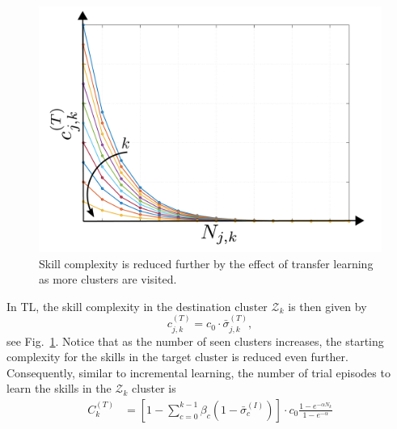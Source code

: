 \begin{figure}[!h]
	\centering
	\includegraphics[width=0.99\columnwidth]{fig/single_transfer_complexity.pdf}
	\caption{Skill complexity is reduced further by the effect of transfer learning as more clusters are visited.}
	\label{fig:single_transfer_complexity}
\end{figure}
In TL, the skill complexity in the destination cluster $\mathcal{Z}_k$ is then given by
\begin{equation}
    c^{(T)}_{j,k} = c_0 \cdot \bar{\sigma}^{(T)}_{j,k},
\end{equation}
see Fig.~\ref{fig:single_transfer_complexity}. Notice that as the number of seen clusters increases, the starting complexity for the skills in the target cluster is reduced even further. Consequently, similar to incremental learning, the number of trial episodes to learn the skills in the $\mathcal{Z}_k$ cluster is
\begin{align}\label{eq:complexity_transfer_single}
	C_{k}^{(T)} &= \left[1 - \sum_{c=0}^{k-1}\beta_{c} \left(1-\bar{\sigma}^{(I)}_{c}\right)\right]  \cdot  c_0 \frac{1 - e^{-\alpha N_k}}{1 - e^{-\alpha}}
\end{align}

